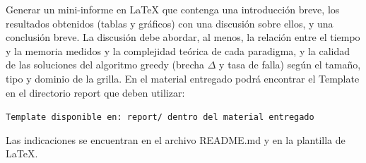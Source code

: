 
Generar un mini-informe en \LaTeX{} que contenga una introducción breve, los resultados obtenidos (tablas y gráficos) con una discusión sobre ellos, y una conclusión breve. La discusión debe abordar, al menos, la relación entre el tiempo y la memoria medidos y la complejidad teórica de cada paradigma, y la calidad de las soluciones del algoritmo greedy (brecha $\Delta$ y tasa de falla) según el tamaño, tipo y dominio de la grilla. En el material entregado podrá encontrar el Template en el directorio report que deben utilizar:

\begin{center}
  \verb|Template disponible en: report/ dentro del material entregado|
\end{center}

Las indicaciones se encuentran en el archivo README.md y en la plantilla de \LaTeX{}.
